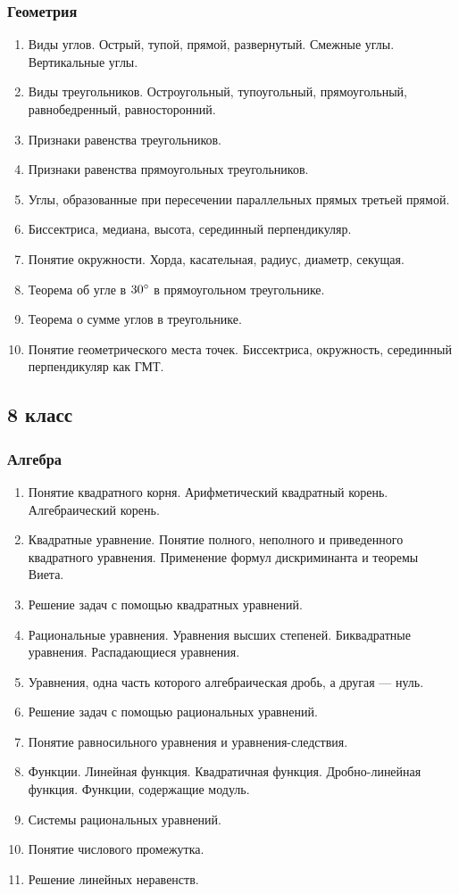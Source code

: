 \documentclass[12pt, a4paper]{article}
\begin{document}
		\subsubsection*{Геометрия}
			\begin{enumerate}[label=\textbf{\arabic*}.]
				\item Виды углов. Острый, тупой, прямой, развернутый. Смежные углы. Вертикальные углы.
				\item Виды треугольников. Остроугольный, тупоугольный, прямоугольный, равнобедренный, равносторонний.
				\item Признаки равенства треугольников.
				\item Признаки равенства прямоугольных треугольников.
				\item Углы, образованные при пересечении параллельных прямых третьей прямой.
				\item Биссектриса, медиана, высота, серединный перпендикуляр.
				\item Понятие окружности. Хорда, касательная, радиус, диаметр, секущая.
				\item Теорема об угле в \( 30\degree \) в прямоугольном треугольнике.
				\item Теорема о сумме углов в треугольнике.
				\item Понятие геометрического места точек. Биссектриса, окружность, серединный перпендикуляр как ГМТ.
			\end{enumerate}
		\subsection*{8 класс}
			\subsubsection*{Алгебра}
			\begin{enumerate}[label=\textbf{\arabic*}.]
				\item Понятие квадратного корня. Арифметический квадратный корень. Алгебраический корень.
				\item Квадратные уравнение. Понятие полного, неполного и приведенного квадратного уравнения. Применение формул дискриминанта и теоремы Виета.
				\item Решение задач с помощью квадратных уравнений.
				\item Рациональные уравнения. Уравнения высших степеней. Биквадратные уравнения. Распадающиеся уравнения.
				\item Уравнения, одна часть которого алгебраическая дробь, а другая --- нуль.
				\item Решение задач с помощью рациональных уравнений.
				\item Понятие равносильного уравнения и уравнения-следствия.
				\item Функции. Линейная функция. Квадратичная функция. Дробно-линейная функция. Функции, содержащие модуль.
				\item Системы рациональных уравнений.
				\item Понятие числового промежутка.
				\item Решение линейных неравенств.
			\end{enumerate}
\end{document}
